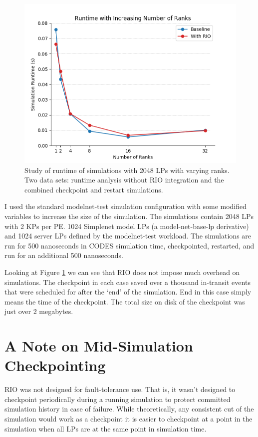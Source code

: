 \documentclass[letterpaper, 11 pt, conference]{IEEEtran}
\begin{document}
\begin{figure}[h] 
	\centering
	\includegraphics[scale=.6]{runtime}
	\caption{Study of runtime of simulations with 2048 LPs with varying ranks. Two data sets: runtime analysis without RIO integration and the combined checkpoint and restart simulations.} \label{fig:runtime}
\end{figure}

I used the standard modelnet-test simulation configuration with some modified variables to increase the size of the simulation. The simulations contain 2048 LPs with 2 KPs per PE. 1024 Simplenet model LPs (a model-net-base-lp derivative) and 1024 server LPs defined by the modelnet-test workload. The simulations are run for 500 nanoseconds in CODES simulation time, checkpointed, restarted, and run for an additional 500 nanoseconds.



Looking at Figure \ref{fig:runtime} we can see that RIO does not impose much overhead on simulations. The checkpoint in each case saved over a thousand in-transit events that were scheduled for after the `end' of the simulation. End in this case simply means the time of the checkpoint. The total size on disk of the checkpoint was just over 2 megabytes.


\section{A Note on Mid-Simulation Checkpointing} \label{sec:challenge}
RIO was not designed for fault-tolerance use. That is, it wasn't designed to checkpoint periodically during a running simulation to protect committed simulation history in case of failure. While theoretically, any consistent cut of the simulation would work as a checkpoint it is easier to checkpoint at a point in the simulation when all LPs are at the same point in simulation time.
\end{document}
